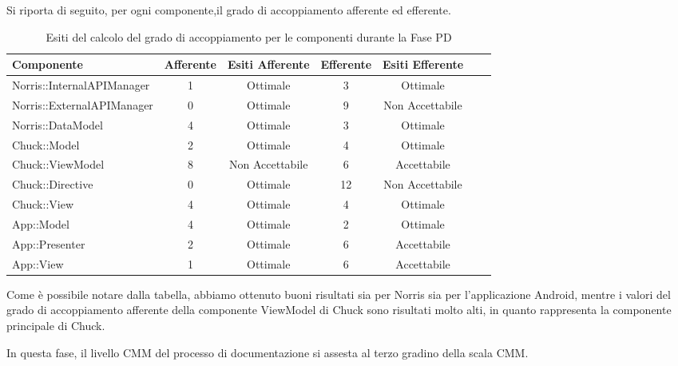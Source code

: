 			Si riporta di seguito, per ogni componente,il grado di accoppiamento afferente ed efferente.
			\begin{table}[H]
				\centering
					\begin{tabu}{| l | c | c | c | c | c | c | }
						\hline
						Componente					& Afferente & Esiti Afferente & Efferente & Esiti Efferente 	\\ \hline \hline
						Norris::InternalAPIManager	& 1 & Ottimale & 3 & Ottimale  \\ \hline
						Norris::ExternalAPIManager  & 0 & Ottimale & 9 & Non Accettabile   \\ \hline
						Norris::DataModel  			& 4 & Ottimale & 3 & Ottimale   \\ \hline
						Chuck::Model 				& 2 & Ottimale & 4 & Ottimale   \\ \hline
						Chuck::ViewModel 			& 8 & Non Accettabile & 6 & Accettabile   \\ \hline
						Chuck::Directive 			& 0 & Ottimale & 12 & Non Accettabile   \\ \hline
						Chuck::View 				& 4 & Ottimale & 4 & Ottimale   \\ \hline
						App::Model 					& 4 & Ottimale & 2 & Ottimale   \\ \hline
						App::Presenter 				& 2 & Ottimale & 6 & Accettabile   \\ \hline
						App::View 					& 1 & Ottimale & 6 & Accettabile   \\ \hline
					\end{tabu}
				\caption{Esiti del calcolo del grado di accoppiamento per le componenti durante la Fase PD}
			\end{table}
			Come è possibile notare dalla tabella, abbiamo ottenuto buoni risultati sia per Norris sia per l'applicazione Android, mentre i valori del grado di accoppiamento afferente della componente ViewModel di Chuck sono risultati molto alti, in quanto rappresenta la componente principale di Chuck.
			 
			In questa fase, il livello CMM del processo di documentazione si assesta al terzo gradino della scala CMM.

